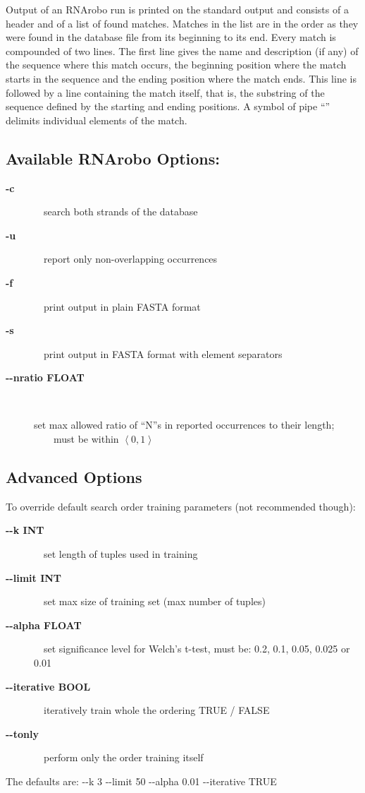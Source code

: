 \documentclass[11pt]{article}
\begin{document}
Output of an RNArobo run is printed on the standard output and consists of a header and of a list of found matches. Matches in the list are in the order as they were found in the database file from its beginning to its end. Every match is compounded of two lines. The first line gives the name and description (if any) of the sequence where this match occurs, the beginning position where the match starts in the sequence and the ending position where the match ends. This line is followed by a line containing the match itself, that is, the substring of the sequence defined by the starting and ending positions. A symbol of pipe ``\textbar'' delimits individual elements of the match.

\subsection*{Available RNArobo Options:}
\begin{description}
\item[\textbf{-c}] ~~search both strands of the database
\item[\textbf{-u}] ~~report only non-overlapping occurrences
\item[\textbf{-f}] ~~print output in plain FASTA format
\item[\textbf{-s}] ~~print output in FASTA format with element separators
\item[\textbf{-{}-nratio FLOAT}] ~
\begin{minipage}{0.7\textwidth}
set max allowed ratio of ``N''s in reported occurrences to their length;\\
~~~~must be within  $\left\langle 0, 1 \right\rangle$
\end{minipage} 
\end{description}

\subsection*{Advanced Options}
To override default search order training parameters (not recommended though):
\begin{description}
\item[\textbf{-{}-k INT}] ~~set length of tuples used in training
\item[\textbf{-{}-limit INT}] ~~set max size of training set (max number of tuples)
\item[\textbf{-{}-alpha FLOAT}] ~~set significance level for Welch's t-test, must be: 0.2, 0.1, 0.05, 0.025 or 0.01
\item[\textbf{-{}-iterative BOOL}] ~~iteratively train whole the ordering TRUE / FALSE
\item[\textbf{-{}-tonly}] ~~perform only the order training itself
\end{description}
The defaults are: -{}-k 3 -{}-limit 50 -{}-alpha 0.01 -{}-iterative TRUE


 
\end{document}
